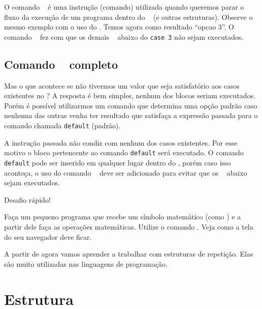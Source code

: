O comando \comandobreak~ é uma instrução (comando) utilizada quando queremos parar o fluxo da 
execução de um programa dentro do \comandoswitch~ (e outras estruturas).
Observe o mesmo exemplo com o uso do \comandobreak. Temos agora como resultado “opcao 3”. 
O comando \comandobreak~ fez com que os demais \comandocase~ abaixo do \texttt{case 3} 
não sejam executados.



\subsection{Comando \comandoswitch~ completo}
\label{comando-switch-completo}

Mas o que acontece se não tivermos um valor que seja satisfatório aos casos 
existentes no \comandoswitch? A resposta é bem simples, nenhum dos blocos seriam executados.
Porém é possível utilizarmos um comando que determina uma opção padrão caso nenhuma das outras 
venha ter resultado que satisfaça a expressão passada para o comando \comandoswitch 
chamada \texttt{default} (padrão).



A instrução passada não condiz com nenhum dos casos existentes. Por esse motivo o bloco 
pertencente ao comando \texttt{default} será executado. O comando \texttt{default} pode ser 
inserido em qualquer lugar dentro do \comandoswitch, porém caso isso aconteça, 
o uso do comando \comandobreak~ deve ser adicionado para evitar que os \comandocase~ abaixo 
sejam executados.

{\Large Desafio rápido!}

Faça um pequeno programa que recebe um símbolo matemático (como \tipostring) e a partir dele
faça as operações matemáticas. Utilize o comando \comandoswitch. Veja como a tela do seu 
navegador deve ficar.


A partir de agora vamos aprender a trabalhar com estruturas de repetição. 
Elas são muito utilizadas nas linguagens de programação.

\section{Estrutura \comandowhile}
\label{estrutura-while}

